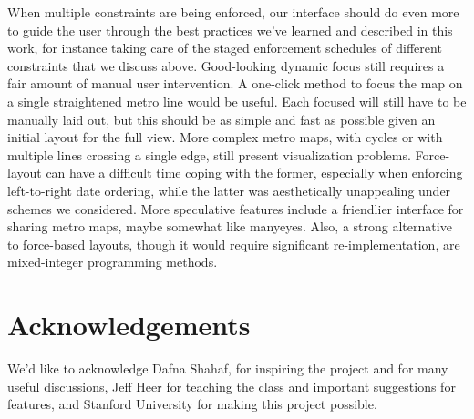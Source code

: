 \documentclass{chi2009}
\begin{document}
When multiple constraints are being enforced, our interface should do even more to guide the user through the best practices we’ve learned and described in this work, for instance taking care of the staged enforcement schedules of different constraints that we discuss above.
       Good-looking dynamic focus still requires a fair amount of manual user intervention. A one-click method to focus the map on a single straightened metro line would be useful. Each focused will still have to be manually laid out, but this should be as simple and fast as possible given an initial layout for the full view.
       More complex metro maps, with cycles or with multiple lines crossing a single edge, still present visualization problems. Force-layout can have a difficult time coping with the former, especially when enforcing left-to-right date ordering, while the latter was aesthetically unappealing under schemes we considered.
       More speculative features include a friendlier interface for sharing metro maps, maybe somewhat like manyeyes. Also, a strong alternative to force-based layouts, though it would require significant re-implementation, are mixed-integer programming methods.  

\section{Acknowledgements}

We'd like to acknowledge Dafna Shahaf, for inspiring the project and for many useful discussions, Jeff Heer for teaching the class and important suggestions for features, and Stanford University for making this project possible.



\end{document}
